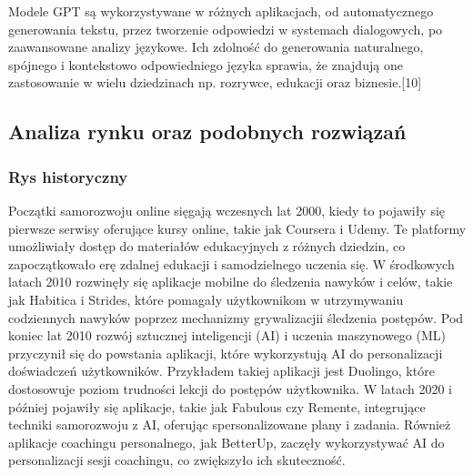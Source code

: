 \begin{enumerate}
    Modele GPT są wykorzystywane w różnych aplikacjach, od automatycznego generowania tekstu, przez tworzenie odpowiedzi w systemach dialogowych, po zaawansowane analizy językowe. Ich zdolność do generowania naturalnego, spójnego i kontekstowo odpowiedniego języka sprawia, że znajdują one zastosowanie w wielu dziedzinach np. rozrywce, edukacji oraz biznesie.[10]
    \\
     
 \end{enumerate}
\subsection{Analiza rynku oraz podobnych rozwiązań}

\subsubsection{Rys historyczny}
Początki samorozwoju online sięgają wczesnych lat 2000, kiedy to pojawiły się pierwsze serwisy oferujące kursy online, takie jak Coursera i Udemy. Te platformy umożliwiały dostęp do materiałów edukacyjnych z różnych dziedzin, co zapoczątkowało erę zdalnej edukacji i samodzielnego uczenia się. W środkowych latach 2010 rozwinęły się aplikacje mobilne do śledzenia nawyków i celów, takie jak Habitica i Strides, które pomagały użytkownikom w utrzymywaniu codziennych nawyków poprzez mechanizmy grywalizacji\linebreak i śledzenia postępów.
Pod koniec lat 2010 rozwój sztucznej inteligencji (AI) i uczenia maszynowego (ML) przyczynił się do powstania aplikacji, które wykorzystują AI do personalizacji doświadczeń użytkowników. Przykładem takiej aplikacji jest Duolingo, które dostosowuje poziom trudności lekcji do postępów użytkownika. W latach 2020 i później pojawiły się aplikacje, takie jak Fabulous czy Remente, integrujące techniki samorozwoju z AI, oferując spersonalizowane plany i zadania. Również aplikacje coachingu personalnego, jak BetterUp, zaczęły wykorzystywać AI do personalizacji sesji coachingu, co zwiększyło ich skuteczność.

